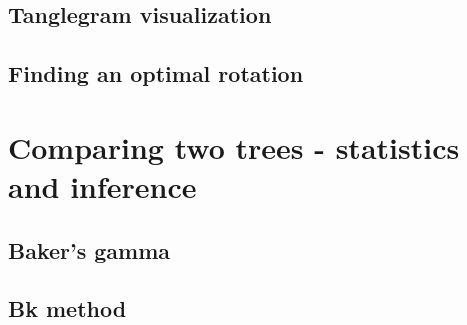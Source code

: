 \documentclass[shortnames,nojss,article]{jss}\usepackage{graphicx, color}
\begin{document}
\subsection{Tanglegram visualization}

\subsection{Finding an optimal rotation}


\section{Comparing two trees - statistics and inference}

\subsection{Baker's gamma}

\subsection{Bk method}














% 
% 
% 
% 
% 
%   
%   
% 
% 

\end{document}
